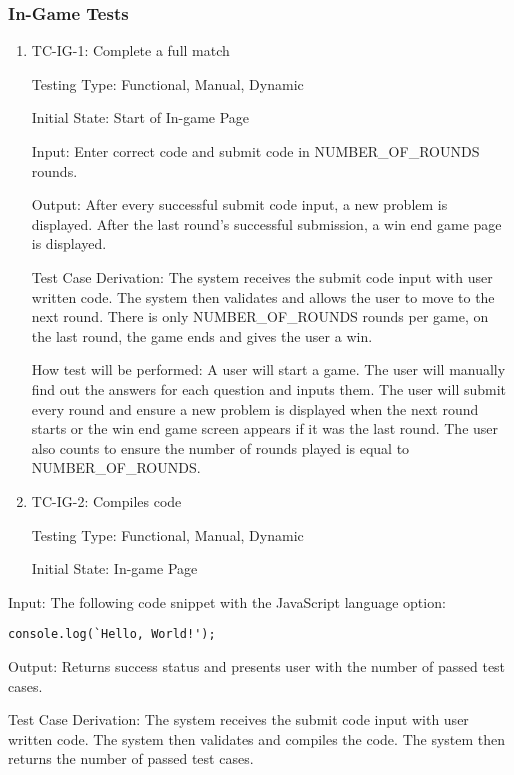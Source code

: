 \documentclass[12pt, titlepage]{article}
\begin{document}
\subsubsection{In-Game Tests}

\begin{enumerate}

\item{TC-IG-1: Complete a full match}

Testing Type: Functional, Manual, Dynamic
					
Initial State: Start of In-game Page
					
Input: Enter correct code and submit code in NUMBER\_OF\_ROUNDS rounds.
					
Output: After every successful submit code input, a new problem is displayed. After the last round's successful submission, a win end game page is displayed.

Test Case Derivation: The system receives the submit code input with user written code. The system then validates and allows the user to move to the next round. There is only NUMBER\_OF\_ROUNDS rounds per game, on the last round, the game ends and gives the user a win.
					
How test will be performed: A user will start a game. The user will manually find out the answers for each question and inputs them. The user will submit every round and ensure a new problem is displayed when the next round starts or the win end game screen appears if it was the last round. The user also counts to ensure the number of rounds played is equal to NUMBER\_OF\_ROUNDS.

\item{TC-IG-2: Compiles code}

Testing Type: Functional, Manual, Dynamic
					
Initial State: In-game Page
					
\end{enumerate} 

Input: The following code snippet with the JavaScript language option:
\begin{verbatim}
console.log(`Hello, World!');
\end{verbatim}
					
Output: Returns success status and presents user with the number of passed test cases.

Test Case Derivation: The system receives the submit code input with user written code. The system then validates and compiles the code. The system then returns the number of passed test cases.
					
\end{document}
